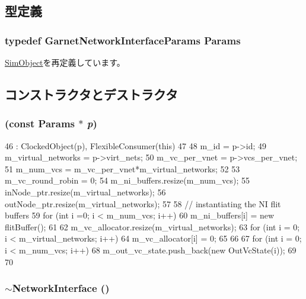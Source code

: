 \subsection{型定義}
\hypertarget{classNetworkInterface_a24441f24d6be514d5461dd3b86ea9e99}{
\subsubsection[{Params}]{\setlength{\rightskip}{0pt plus 5cm}typedef GarnetNetworkInterfaceParams {\bf Params}}}
\label{classNetworkInterface_a24441f24d6be514d5461dd3b86ea9e99}


\hyperlink{classSimObject_a0f0761d2db586a23bb2a2880b8f387bb}{SimObject}を再定義しています。

\subsection{コンストラクタとデストラクタ}
\hypertarget{classNetworkInterface_aaf2a99dc56c8a507bc84059dac4db78b}{
\subsubsection[{NetworkInterface}]{ (const {\bf Params} $\ast$ {\em p})}}
\label{classNetworkInterface_aaf2a99dc56c8a507bc84059dac4db78b}



\begin{DoxyCode}
46     : ClockedObject(p), FlexibleConsumer(this)
47 {
48     m_id = p->id;
49     m_virtual_networks  = p->virt_nets;
50     m_vc_per_vnet = p->vcs_per_vnet;
51     m_num_vcs = m_vc_per_vnet*m_virtual_networks;
52 
53     m_vc_round_robin = 0;
54     m_ni_buffers.resize(m_num_vcs);
55     inNode_ptr.resize(m_virtual_networks);
56     outNode_ptr.resize(m_virtual_networks);
57 
58     // instantiating the NI flit buffers
59     for (int i =0; i < m_num_vcs; i++)
60         m_ni_buffers[i] = new flitBuffer();
61 
62     m_vc_allocator.resize(m_virtual_networks);
63     for (int i = 0; i < m_virtual_networks; i++) {
64         m_vc_allocator[i] = 0;
65     }
66 
67     for (int i = 0; i < m_num_vcs; i++) {
68         m_out_vc_state.push_back(new OutVcState(i));
69     }
70 }
\end{DoxyCode}
\hypertarget{classNetworkInterface_adb551ec6b647bebdc200a6f3d856be0b}{
\subsubsection[{$\sim$NetworkInterface}]{\setlength{\rightskip}{0pt plus 5cm}$\sim${\bf NetworkInterface} ()}}
\label{classNetworkInterface_adb551ec6b647bebdc200a6f3d856be0b}




